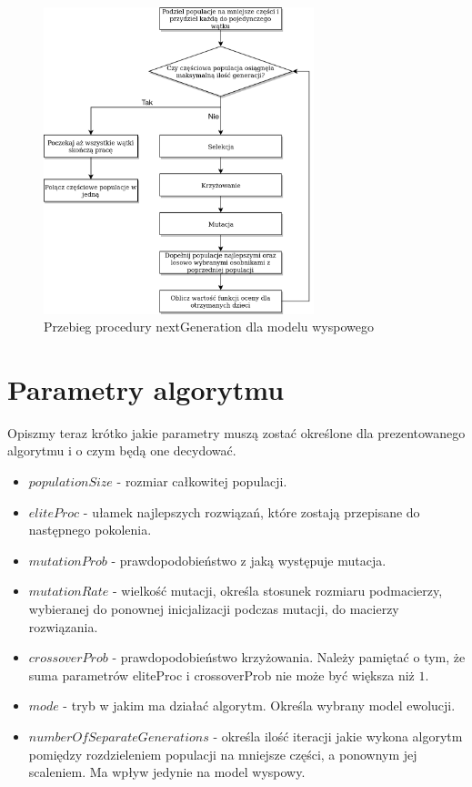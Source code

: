 \begin{figure}[H]
    \centering        
    \includegraphics[width=0.7\textwidth]{img/next_gen_wyspowy.png}
    \caption{Przebieg procedury nextGeneration dla modelu wyspowego}
    \label{next_gen_wyspowy_img}
\end{figure}


\section{Parametry algorytmu}
Opiszmy teraz krótko jakie parametry muszą zostać określone dla prezentowanego algorytmu i o czym będą one decydować.

\begin{itemize}
    \item $populationSize$ - rozmiar całkowitej populacji.
    \item $eliteProc$ - ułamek najlepszych rozwiązań, które zostają przepisane do następnego pokolenia.
    \item $mutationProb$ - prawdopodobieństwo z jaką występuje mutacja.
    \item $mutationRate$ - wielkość mutacji, określa stosunek rozmiaru podmacierzy, wybieranej do ponownej inicjalizacji podczas mutacji, 
    do macierzy rozwiązania.
    \item $crossoverProb$ - prawdopodobieństwo krzyżowania. Należy pamiętać o tym, że suma parametrów eliteProc i crossoverProb nie 
    może być większa niż $1$.
    \item $mode$ - tryb w jakim ma działać algorytm. Określa wybrany model ewolucji.
    \item $numberOfSeparateGenerations$ - określa ilość iteracji jakie wykona algorytm pomiędzy rozdzieleniem populacji na 
    mniejsze części, a ponownym jej scaleniem. Ma wpływ jedynie na model wyspowy. 
\end{itemize}

